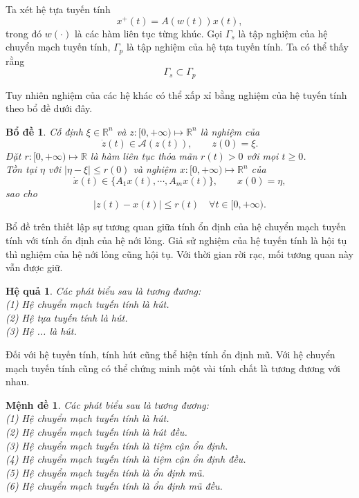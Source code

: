 \documentclass[14pt,a4paper,oneside]{report}		%
\newtheorem{lemma}[theorem]{Bổ đề}
\newtheorem{corollary}[theorem]{Hệ quả}
\newtheorem{proposition}[theorem]{Mệnh đề}
\begin{document}
Ta xét hệ tựa tuyến tính
\begin{equation} \label{eq2-23}
x^+(t)=A(w(t))x(t),
\end{equation}
trong đó $w(\cdot)$ là các hàm liên tục từng khúc. Gọi $\Gamma_s$ là tập nghiệm của hệ chuyển mạch tuyến tính, $\Gamma_p$ là tập nghiệm của hệ tựa tuyến tính. Ta có thể thấy rằng 
$$\Gamma_s\subset\Gamma_p$$

Tuy nhiên nghiệm của các hệ khác có thể xấp xỉ bằng nghiệm của hệ tuyến tính theo bổ đề dưới đây.

\begin{lemma} \label{le1}
Cố định $\xi\in\mathbb{R}^n$ và $z:[0,+\infty)\mapsto\mathbb{R}^n$ là nghiệm của
$$\dot{z}(t)\in\mathcal{A}(z(t)), \qquad z(0)=\xi.$$
Đặt $r:[0,+\infty)\mapsto\mathbb{R}$ là hàm liên tục thỏa mãn $r(t)>0$ với mọi $t\geq 0$.\\
Tồn tại $\eta$ với $|\eta - \xi|\leq r(0)$ và nghiệm $x:[0,+\infty)\mapsto\mathbb{R}^n$ của
$$\dot{x}(t)\in\{A_1x(t),\cdots,A_mx(t)\},\qquad x(0)=\eta,$$
sao cho
$$|z(t)-x(t)|\leq r(t)\quad\forall t\in[0,+\infty).$$
\end{lemma}

Bổ đề trên thiết lập sự tương quan giữa tính ổn định của hệ chuyển mạch tuyến tính với tính ổn định của hệ nới lỏng. Giả sử nghiệm của hệ tuyến tính là hội tụ thì nghiệm của hệ nới lỏng cũng hội tụ. Với thời gian rời rạc, mối tương quan này vẫn được giữ.

\begin{corollary} \label{co2-12}
Các phát biểu sau là tương đương:\\
(1) Hệ chuyển mạch tuyến tính là hút.\\
(2) Hệ tựa tuyến tính là hút.\\
(3) Hệ ... là hút.
\end{corollary}

Đối với hệ tuyến tính, tính hút cũng thể hiện tính ổn định mũ. Với hệ chuyển mạch tuyến tính cũng có thể chứng minh một vài tính chất là tương đương với nhau.

\begin{proposition} \label{pro2-13}
Các phát biểu sau là tương đương:\\
(1) Hệ chuyển mạch tuyến tính là hút.\\
(2) Hệ chuyển mạch tuyến tính là hút đều.\\
(3) Hệ chuyển mạch tuyến tính là tiệm cận ổn định.\\
(4) Hệ chuyển mạch tuyến tính là tiệm cận ổn định đều.\\
(5) Hệ chuyển mạch tuyến tính là ổn định mũ.\\
(6) Hệ chuyển mạch tuyến tính là ổn định mũ đều.
\end{proposition}
\end{document}
